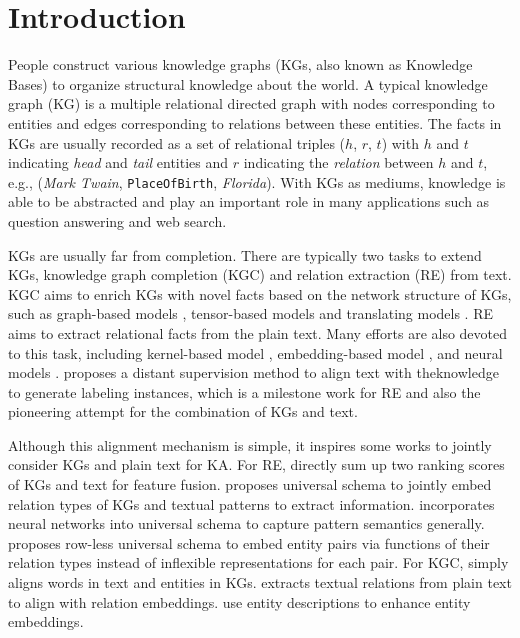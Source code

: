 \documentclass[letterpaper]{article} %
\begin{document}
\section{Introduction}
\label{intro}

People construct various knowledge graphs (KGs, also known as Knowledge Bases) to organize structural knowledge about the world. A typical knowledge graph (KG) is a multiple relational directed graph with nodes corresponding to entities and edges corresponding to relations between these entities. The facts in KGs are usually recorded as a set of relational triples ($h$, $r$, $t$) with $h$ and $t$ indicating \emph{head} and \emph{tail} entities and $r$ indicating the \emph{relation} between $h$ and $t$, e.g., (\emph{Mark Twain}, \texttt{PlaceOfBirth}, \emph{Florida}). With KGs as mediums, knowledge is able to be abstracted and play an important role in many applications such as question answering and web search.

KGs are usually far from completion. There are typically two tasks to extend KGs, knowledge graph completion (KGC) and relation extraction (RE) from text. KGC aims to enrich KGs with novel facts based on the network structure of KGs, such as graph-based models \cite{lao2010relational,lao2011random}, tensor-based models \cite{socher2013reasoning,nickel2016holographic} and translating models \cite{bordes2013translating,ji2015knowledge}. RE aims to extract relational facts from the plain text. Many efforts are also devoted to this task, including kernel-based model \cite{zelenko2003kernel}, embedding-based model \cite{gormley2015improved}, and neural models \cite{socher2012semantic,zeng2014relation}. \cite{mintz2009distant} proposes a distant supervision method to align text with theknowledge to generate labeling instances, which is a milestone work for RE and also the pioneering attempt for the combination of KGs and text.

Although this alignment mechanism is simple, it inspires some works to jointly consider KGs and plain text for KA. For RE, \cite{weston2013connecting} directly sum up two ranking scores of KGs and text for feature fusion. \cite{riedel2013relation} proposes universal schema to jointly embed relation types of KGs and textual patterns to extract information. \cite{vergaEtAl} incorporates neural networks into universal schema to capture pattern semantics generally. \cite{vergamccallum} proposes row-less universal schema to embed entity pairs via functions of their relation types instead of inflexible representations for each pair. For KGC, \cite{wang2014knowledge} simply aligns words in text and entities in KGs. \cite{toutanova2015representing} extracts textual relations from plain text to align with relation embeddings. \cite{zhong2015aligning,xie2016representation,wang2016text} use entity descriptions to enhance entity embeddings. 
\end{document}
